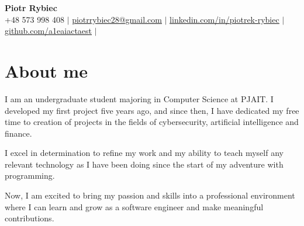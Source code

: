 \documentclass[letterpaper,11pt]{article}
\begin{document}
\begin{center}
  \textbf{\Huge Piotr Rybiec} \\ \vspace{1pt}
  \small +48 573 998 408 $|$ \href{mailto:piotrrybiec28@gmail.com}{\underline{piotrrybiec28@gmail.com}} $|$
  \href{https://linkedin.com/in/piotrek-rybiec}{\underline{linkedin.com/in/piotrek-rybiec}} $|$
  \href{https://github.com/a1eaiactaest}{\underline{github.com/a1eaiactaest}} $|$
\end{center}

\section{About me}
\begin{minipage}[t]{0.80\textwidth}
    \vspace{0pt}
    I am an undergraduate student majoring in Computer Science at PJAIT. I developed my first project five years ago, and since then, I have dedicated my free time to creation of projects in the fields of cybersecurity, artificial intelligence and finance. 
    \newline
    \par
    I excel in determination to refine my work and my ability to teach myself any relevant technology as I have been doing since the start of my adventure with programming. 
    \newline
    \par
    Now, I am excited to bring my passion and skills into a professional environment where I can learn and grow as a software engineer and make meaningful contributions.
  \end{minipage}
  \hspace{2pt}
  \hfill
\end{document}

